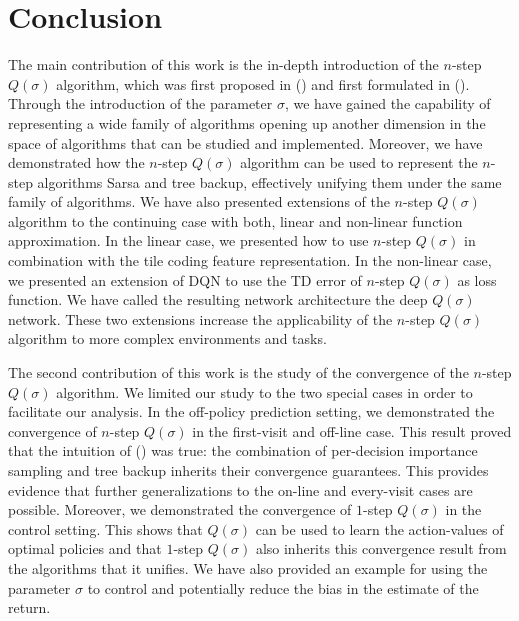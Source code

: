 \providecommand{\main}{..}

\onlyinsubfile{}



\chapter{Conclusion}
\label{ch6:conclusion}

The main contribution of this work is the in-depth introduction of the $n$-step $Q(\sigma)$ algorithm, which was first proposed in \citeauthor{precup2000} (\citeyear{precup2000}) and first formulated in \citeauthor{sutton2018} (\citeyear{sutton2018}). 
Through the introduction of the parameter $\sigma$, we have gained the capability of representing a wide family of algorithms opening up another dimension in the space of algorithms that can be studied and implemented.
Moreover, we have demonstrated how the $n$-step $Q(\sigma)$ algorithm can be used to represent the $n$-step algorithms Sarsa and tree backup, effectively unifying them under the same family of algorithms.
We have also presented extensions of the $n$-step $Q(\sigma)$ algorithm to the continuing case with both, linear and non-linear function approximation.
In the linear case, we presented how to use $n$-step $Q(\sigma)$ in combination with the tile coding feature representation.
In the non-linear case, we presented an extension of DQN to use the TD error of $n$-step $Q(\sigma)$ as loss function.
We have called the resulting network architecture the deep $Q(\sigma)$ network.
These two extensions increase the applicability of the $n$-step $Q(\sigma)$ algorithm to more complex environments and tasks.

The second contribution of this work is the study of the convergence of the $n$-step $Q(\sigma)$ algorithm.
We limited our study to the two special cases in order to facilitate our analysis.
In the off-policy prediction setting, we demonstrated the convergence of $n$-step $Q(\sigma)$ in the first-visit and off-line case.
This result proved that the intuition of \citeauthor{precup2000} (\citeyear{precup2000}) was true: the combination of per-decision importance sampling and tree backup inherits their convergence guarantees.
This provides evidence that further generalizations to the on-line and every-visit cases are possible.
Moreover, we demonstrated the convergence of $1$-step $Q(\sigma)$ in the control setting.
This shows that $Q(\sigma)$ can be used to  learn the action-values of optimal policies and that $1$-step $Q(\sigma)$ also inherits this convergence result from the algorithms that it unifies.
We have also provided an example for using the parameter $\sigma$ to control and potentially reduce the bias in the estimate of the return. 

